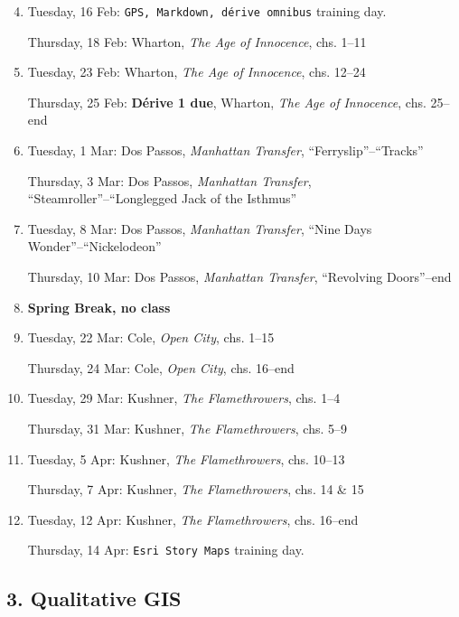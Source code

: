 \begin{enumerate}
 \setcounter{enumi}{3}
\item Tuesday, 16 Feb: \texttt{GPS, Markdown, dérive omnibus} training day.

  Thursday, 18 Feb: Wharton, \textit{The Age of Innocence}, chs. 1--11

  \item Tuesday, 23 Feb: Wharton, \textit{The Age of Innocence},  chs. 12--24

    Thursday, 25 Feb: \textbf{\small Dérive 1 due}, Wharton,  \textit{The Age of Innocence}, chs. 25--end
  
  \item Tuesday, 1 Mar: Dos Passos, \textit{Manhattan Transfer}, “Ferryslip”--“Tracks”

    Thursday, 3 Mar: Dos Passos,  \textit{Manhattan Transfer}, “Steamroller”--“Longlegged Jack of the Isthmus”

  \item Tuesday, 8 Mar: Dos Passos,  \textit{Manhattan Transfer}, “Nine Days Wonder”--“Nickelodeon”

    Thursday, 10 Mar: Dos Passos,  \textit{Manhattan Transfer}, “Revolving Doors”--end

  \item \textbf{Spring Break, no class}

  \item Tuesday, 22 Mar: Cole, \textit{Open City}, chs. 1--15

    Thursday, 24 Mar: Cole,  \textit{Open City}, chs. 16--end

  \item Tuesday, 29 Mar: Kushner, \textit{The Flamethrowers}, chs. 1--4

    Thursday, 31 Mar: Kushner, \textit{The Flamethrowers}, chs. 5--9

  \item Tuesday, 5 Apr: Kushner, \textit{The Flamethrowers}, chs. 10--13 
  
    Thursday, 7 Apr: Kushner, \textit{The Flamethrowers}, chs. 14 \& 15

  \item Tuesday, 12 Apr: Kushner, \textit{The Flamethrowers}, chs. 16--end 

    Thursday, 14 Apr: \texttt{Esri Story Maps} training day.

\end{enumerate}

\subsection{3. Qualitative GIS}

